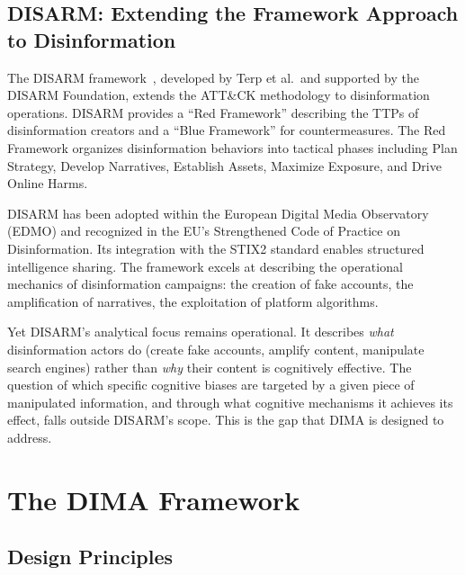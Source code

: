 \documentclass[11pt,a4paper]{article}
\begin{document}
\subsection{DISARM: Extending the Framework Approach to Disinformation}

The DISARM framework~\cite{terp2022, disarm2024}, developed by Terp et al.\ and supported by the DISARM Foundation, extends the ATT\&CK methodology to disinformation operations. DISARM provides a ``Red Framework'' describing the TTPs of disinformation creators and a ``Blue Framework'' for countermeasures. The Red Framework organizes disinformation behaviors into tactical phases including Plan Strategy, Develop Narratives, Establish Assets, Maximize Exposure, and Drive Online Harms.

DISARM has been adopted within the European Digital Media Observatory (EDMO) and recognized in the EU's Strengthened Code of Practice on Disinformation. Its integration with the STIX2 standard enables structured intelligence sharing. The framework excels at describing the operational mechanics of disinformation campaigns: the creation of fake accounts, the amplification of narratives, the exploitation of platform algorithms.

Yet DISARM's analytical focus remains operational. It describes \textit{what} disinformation actors do (create fake accounts, amplify content, manipulate search engines) rather than \textit{why} their content is cognitively effective. The question of which specific cognitive biases are targeted by a given piece of manipulated information, and through what cognitive mechanisms it achieves its effect, falls outside DISARM's scope. This is the gap that DIMA is designed to address.

\section{The DIMA Framework}
\label{sec:framework}

\subsection{Design Principles}
\end{document}
